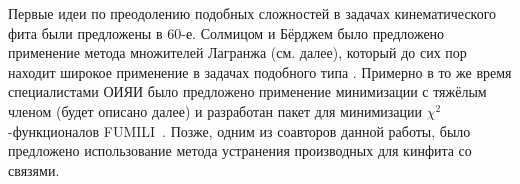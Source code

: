 
Первые идеи по преодолению подобных сложностей в задачах кинематического фита были предложены в 60-е. Солмицом и Бёрджем \cite{b1} было предложено применение метода множителей Лагранжа (см. далее), который до сих пор находит широкое применение в задачах подобного типа \cite{b4}. %
Примерно в то же время специалистами ОИЯИ было предложено применение минимизации с тяжёлым членом \cite{b5} (будет описано далее) и разработан пакет для минимизации $\chi^2$-функционалов FUMILI~\cite{fum_1st}.
Позже, одним из соавторов данной работы, было предложено \cite{b6} использование метода устранения производных для кинфита со связями.
